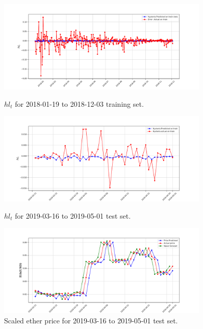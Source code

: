 \begin{figure}[h!]
	\centering
	\begin{minipage}[b]{\textwidth}
		\includegraphics[width=0.9\textwidth]{data/2018_hys_senti.pdf}
		\caption{ $hl_{t}$ for 2018-01-19  to  2018-12-03 training set.}
		\label{fig:sent2018}
	\end{minipage}
	\hfill
	\begin{minipage}[b]{\textwidth}
		\includegraphics[width=0.9\textwidth]{data/2019_hys_senti.pdf}
		\caption{$hl_{t}$  for 2019-03-16 to 2019-05-01 test set.}
		\label{fig:sent2019}
	\end{minipage}
	\begin{minipage}[b]{\textwidth}
		\includegraphics[width=0.9\textwidth]{data/hys_fin.pdf}
		\caption{Scaled ether price  for 2019-03-16 to 2019-05-01 test set.}
		\label{fig:s2019}
	\end{minipage}
\end{figure}




